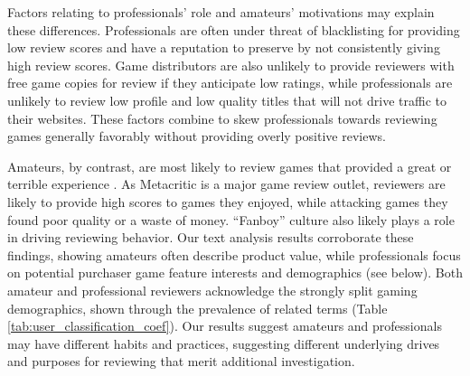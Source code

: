 \documentclass[letterpaper]{article}
\begin{document}
Factors relating to professionals' role and amateurs' motivations may explain these differences. Professionals are often under threat of blacklisting for providing low review scores and have a reputation to preserve by not consistently giving high review scores. Game distributors are also unlikely to provide reviewers with free game copies for review if they anticipate low ratings, while professionals are unlikely to review low profile and low quality titles that will not drive traffic to their websites. These factors combine to skew professionals towards reviewing games generally favorably without providing overly positive reviews.

Amateurs, by contrast, are most likely to review games that provided a great or terrible experience \cite{gilbert2010deja}. As Metacritic is a major game review outlet, reviewers are likely to provide high scores to games they enjoyed, while attacking games they found poor quality or a waste of money. ``Fanboy'' culture also likely plays a role in driving reviewing behavior. Our text analysis results corroborate these findings, showing amateurs often describe product value, while professionals focus on potential purchaser game feature interests and demographics (see below). Both amateur and professional reviewers acknowledge the strongly split gaming demographics, shown through the prevalence of related terms (Table \ref{tab:user_classification_coef}). 
Our results suggest amateurs and professionals may have different habits and practices, suggesting different underlying drives and purposes for reviewing that merit additional investigation.
\end{document}
